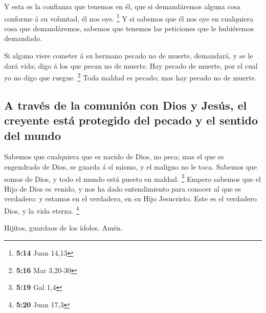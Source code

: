  Y esta es la confianza que tenemos en él, que si
demandáremos alguna cosa conforme á su voluntad, él nos oye. \footnote{\textbf{5:14}
  Juan 14,13}  Y si sabemos que él nos oye en cualquiera
cosa que demandáremos, sabemos que tenemos las peticiones que le
hubiéremos demandado.

 Si alguno viere cometer á su hermano pecado no de muerte,
demandará, y se le dará vida; digo á los que pecan no de muerte. Hay
pecado de muerte, por el cual yo no digo que ruegue. \footnote{\textbf{5:16}
  Mar 3,20-30}  Toda maldad es pecado; mas hay pecado no de
muerte.

\hypertarget{a-travuxe9s-de-la-comuniuxf3n-con-dios-y-jesuxfas-el-creyente-estuxe1-protegido-del-pecado-y-el-sentido-del-mundo}{%
\subsection{A través de la comunión con Dios y Jesús, el creyente está
protegido del pecado y el sentido del
mundo}\label{a-travuxe9s-de-la-comuniuxf3n-con-dios-y-jesuxfas-el-creyente-estuxe1-protegido-del-pecado-y-el-sentido-del-mundo}}

 Sabemos que cualquiera que es nacido de Dios, no peca; mas
el que es engendrado de Dios, se guarda á sí mismo, y el maligno no le
toca.  Sabemos que somos de Dios, y todo el mundo está
puesto en maldad. \footnote{\textbf{5:19} Gal 1,4}  Empero
sabemos que el Hijo de Dios es venido, y nos ha dado entendimiento para
conocer al que es verdadero: y estamos en el verdadero, en su Hijo
Jesucristo. Este es el verdadero Dios, y la vida eterna. \footnote{\textbf{5:20}
  Juan 17,3}

 Hijitos, guardaos de los ídolos. Amén.

